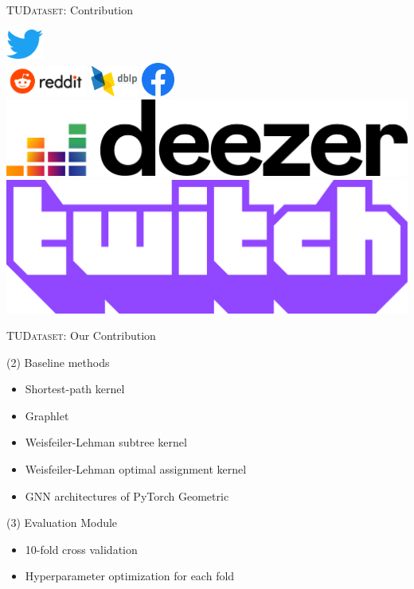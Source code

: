 \documentclass[utf8, xcolor=dvipsnames,ngerman]{beamer}
\begin{document}
\begin{frame}[t]{\textsc{TUDataset}: Contribution}
\begin{center}
{\includegraphics[height=1cm]{Twitter_bird_logo_2012.pdf}\\ \vspace{.7em}
\includegraphics[height=1cm]{Reddit_logo_new.pdf}\qquad
\includegraphics[height=1cm]{DBLP_Logo_320x120.png}\qquad
\includegraphics[height=1.1cm]{Facebook_f_logo.pdf}\\ \vspace{.7em}
\includegraphics[height=.9cm]{Deezer_logo.pdf}\qquad
\includegraphics[height=.9cm]{Twitch_logo_2019.pdf}
}%

\end{center}


\end{frame}


\begin{frame}{\textsc{TUDataset}: Our Contribution}

\begin{block}{(2) Baseline methods}
 \begin{itemize}
  \item Shortest-path kernel 
  \item Graphlet  
  \item Weisfeiler-Lehman subtree kernel 
  \item Weisfeiler-Lehman optimal assignment kernel 
  \item GNN architectures of PyTorch Geometric 
 \end{itemize}
\end{block}

\pause

\begin{block}{(3) Evaluation Module}
 \begin{itemize}
  \item 10-fold cross validation
  \item Hyperparameter optimization for each fold
 \end{itemize}
\end{block}
 
\end{frame}
\end{document}

